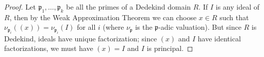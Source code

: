 \documentclass[12pt]{article}
\newcommand{\smp}{\mathfrak{p}}
\begin{document}
\begin{proof} Let $\smp_1,\ldots,\smp_k$ be all the primes of a Dedekind domain $R$. If $I$ is any ideal of $R$, then by the Weak Approximation Theorem we can choose $x\in R$ such that $\nu_{\smp_i}((x))=\nu_{\smp_i}(I)$ for all $i$ (where $\nu_{\smp}$ is the $\smp$-adic valuation). But since $R$ is Dedekind, ideals have unique factorization; since $(x)$ and $I$ have identical factorizations, we must have $(x)=I$ and $I$ is principal.
\end{proof}

\end{document}
